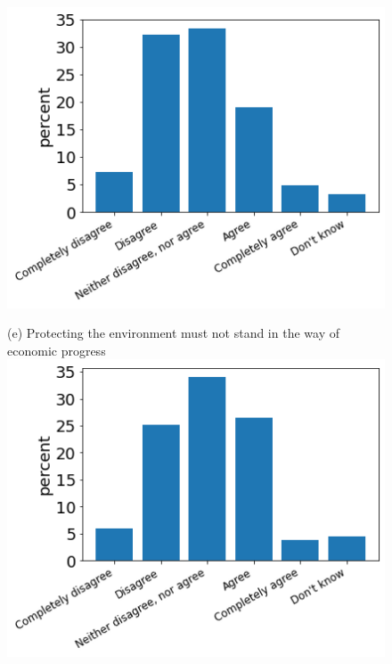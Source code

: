\documentclass[12pt]{article}
\begin{document}
\begin{figure}[h!!]
\begin{minipage}[h!!]{0.32\textwidth}
\includegraphics[width=1\textwidth]{../codding_data/results/liss/qk20a178title0.png}
\end{minipage}		
\begin{minipage}[h!!]{0.32\textwidth}  
\centering\footnotesize{(e) Protecting the environment must not stand in the way of economic progress}
\includegraphics[width=1\textwidth]{../codding_data/results/liss/qk20a180title0.png}
\end{minipage}	
\end{figure}
\end{document}
